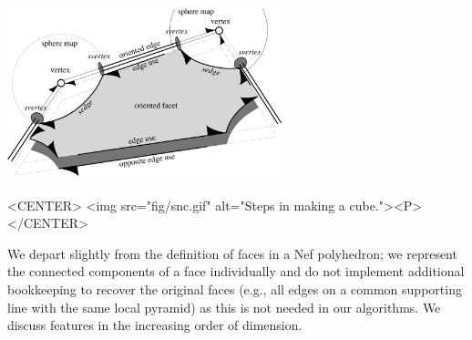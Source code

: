 \begin{ccTexOnly}
    \begin{center}
      \parbox{0.6\textwidth}{%
          \includegraphics[width=0.6\textwidth]{Nef_3/fig/snc}%
      }
    \end{center}
\end{ccTexOnly}

\begin{ccHtmlOnly}
    <CENTER>
        <img src="fig/snc.gif" alt="Steps in making a cube."><P>
    </CENTER>
\end{ccHtmlOnly}

We depart slightly from the
definition of faces in a Nef polyhedron; we represent the connected
components of a face individually and do not implement additional
bookkeeping to recover the original faces (e.g., all edges on a common
supporting line with the same local pyramid) as this is not needed in
our algorithms.  We discuss features in the increasing order of 
dimension.

